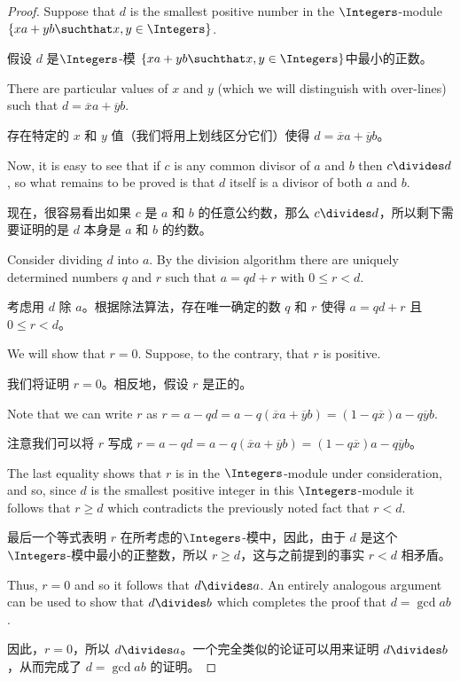 \begin{proof}
Suppose that $d$ is the smallest positive number
in the $\Integers$-module $\{ xa + yb \suchthat x,y \in \Integers \}$.

假设 $d$ 是$\Integers$-模 $\{ xa + yb \suchthat x,y \in \Integers \}$中最小的正数。

There are particular values of $x$ and $y$ (which we will distinguish
with over-lines) such that $d = \overline{x}a + \overline{y}b$.

存在特定的 $x$ 和 $y$ 值（我们将用上划线区分它们）使得 $d = \overline{x}a + \overline{y}b$。

Now, it 
is easy to see that if $c$ is any common divisor of $a$ and $b$ then
$c \divides d$, so what remains to be proved is that $d$ itself is a divisor
of both $a$ and $b$.

现在，很容易看出如果 $c$ 是 $a$ 和 $b$ 的任意公约数，那么 $c \divides d$，所以剩下需要证明的是 $d$ 本身是 $a$ 和 $b$ 的约数。

Consider dividing $d$ into $a$.  By the 
division algorithm there are uniquely determined numbers $q$ and $r$
such that $a =qd + r$ with $0 \leq r < d$.

考虑用 $d$ 除 $a$。根据除法算法，存在唯一确定的数 $q$ 和 $r$ 使得 $a =qd + r$ 且 $0 \leq r < d$。

We will show that $r=0$.
Suppose, to the contrary, that $r$ is positive.

我们将证明 $r=0$。相反地，假设 $r$ 是正的。

Note that we can
write $r$ as $r = a - qd = a - q(\overline{x}a + \overline{y}b) = (1-q\overline{x})a - q\overline{y}b$.

注意我们可以将 $r$ 写成 $r = a - qd = a - q(\overline{x}a + \overline{y}b) = (1-q\overline{x})a - q\overline{y}b$。

The last equality shows that $r$ is in the
$\Integers$-module under consideration, and so, since $d$ is the smallest
positive integer in this $\Integers$-module it follows that $r \geq d$ which
contradicts the previously noted fact that $r < d$.

最后一个等式表明 $r$ 在所考虑的$\Integers$-模中，因此，由于 $d$ 是这个$\Integers$-模中最小的正整数，所以 $r \geq d$，这与之前提到的事实 $r < d$ 相矛盾。

Thus, $r=0$ and so
it follows that $d \divides a$.  An entirely analogous argument can be used
to show that $d \divides b$ which completes the proof that $d = \gcd{a}{b}$.

因此，$r=0$，所以 $d \divides a$。一个完全类似的论证可以用来证明 $d \divides b$，从而完成了 $d = \gcd{a}{b}$ 的证明。
\end{proof} 
 

\clearpage







%
%

